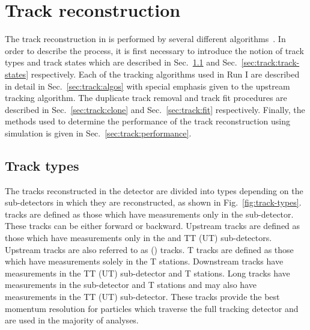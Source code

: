 \section{Track reconstruction}
\label{sec:track}

The track reconstruction in \lhcb is performed by several different algorithms~\cite{tracking}. In order to describe the process, it is first necessary to introduce the notion of track types and track states which are described in Sec.~\ref{sec:track:track-types} and Sec.~\ref{sec:track:track-states} respectively. Each of the tracking algorithms used in Run I are described in detail in Sec.~\ref{sec:track:algos} with special emphasis given to the upstream tracking algorithm. The duplicate track removal and track fit procedures are described in Sec.~\ref{sec:track:clone} and Sec.~\ref{sec:track:fit} respectively. Finally, the methods used to determine the performance of the track reconstruction using simulation is given in Sec.~\ref{sec:track:performance}.

\subsection{Track types}
\label{sec:track:track-types}

The tracks reconstructed in the \lhcb detector are divided into types depending on the sub-detectors in which they are reconstructed, as shown in Fig.~\ref{fig:track-types}. \velo tracks are defined as those which have measurements only in the \velo sub-detector. These tracks can be either forward or backward. Upstream tracks are defined as those which have measurements only in the \velo and TT (UT) sub-detectors. Upstream tracks are also referred to as \velott(\velout) tracks. T tracks are defined as those which have measurements solely in the T stations. Downstream tracks have measurements in the TT (UT) sub-detector and T stations. Long tracks have measurements in the \velo sub-detector and T stations and may also have measurements in the TT (UT) sub-detector. These tracks provide the best momentum resolution for particles which traverse the full tracking detector and are used in the majority of \lhcb analyses.

